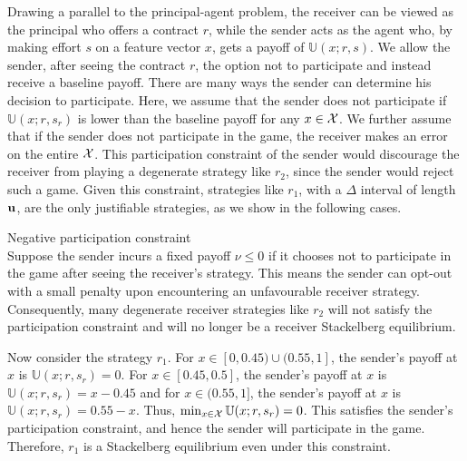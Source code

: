 Drawing a parallel to the principal-agent problem, the receiver can be viewed as the principal who offers a contract $r$, while the sender acts as the agent who, by making effort $s$ on a feature vector $x$, gets a payoff of $\mathbb{U}(x; r, s)$. We allow the sender, after seeing the contract $r$, the option not to participate and instead receive a baseline payoff. There are many ways the sender can determine his decision to participate. Here, we assume that the sender does not participate if $\mathbb{U}(x; r, s_r)$ is lower than the baseline payoff for any $x \in \mathcal{X}$. We further assume that if the sender does not participate in the game, the receiver makes an error on the entire $\mathcal{X}$. This participation constraint of the sender would discourage the receiver from playing a degenerate strategy like $r_2$, since the sender would reject such a game. Given this constraint, strategies like $r_1$, with a $\Delta$ interval of length $\mathbf{u}$, are the only justifiable strategies, as we show in the following cases.


\begin{case}{Negative participation constraint} \\
Suppose the sender incurs a fixed payoff $\nu \leq 0$ if it chooses not to participate in the game after seeing the receiver's strategy. This means the sender can opt-out with a small penalty upon encountering an unfavourable receiver strategy. Consequently, many degenerate receiver strategies like $r_2$ will not satisfy the participation constraint and will no longer be a receiver Stackelberg equilibrium.

Now consider the strategy $r_1$. For $x \in [0, 0.45) \cup (0.55, 1]$, the sender's payoff at $x$ is $\mathbb{U}(x; r, s_r) = 0$. For $x \in [0.45, 0.5]$, the sender's payoff at $x$ is $\mathbb{U}(x; r, s_r) = x - 0.45$ and for $x \in (0.55, 1]$, the sender's payoff at $x$ is $\mathbb{U}(x; r, s_r) = 0.55 - x$. Thus, $\min_{x \in \mathcal{X}} \mathbb{U}(x; r, s_r) = 0$. This satisfies the sender's participation constraint, and hence the sender will participate in the game. Therefore, $r_1$ is a Stackelberg equilibrium even under this constraint.

\end{case}

